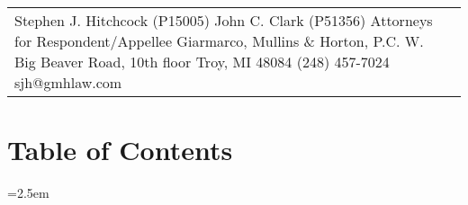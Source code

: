 \documentclass[12pt,\documentclassflag]{michiganCourtOfAppealsBrief}
\begin{document}
\begin{centering}
\begin{tabular}{p{} p{}}
{       Stephen J. Hitchcock (P15005)\newline%
       John C. Clark (P51356)\newline%
       Attorneys for Respondent/Appellee\newline%
       Giarmarco, Mullins \& Horton, P.C.\newline%
       101 W. Big Beaver Road, 10th floor\newline%
       Troy, MI 48084\newline%
       (248) 457-7024\newline%
       sjh@gmhlaw.com
  ~}
\end{tabular}
\makeandletter
\par\vspace{\baselineskip}\vspace{\baselineskip}\vspace{\baselineskip}

\end{centering}

\pagestyle{romanparen}
\newpage 

\section*{Table of Contents}

\tableofcontents

\tableofauthorities

\pagestyle{plain}



\parindent=2.5em
\doublespacing


\end{document}
